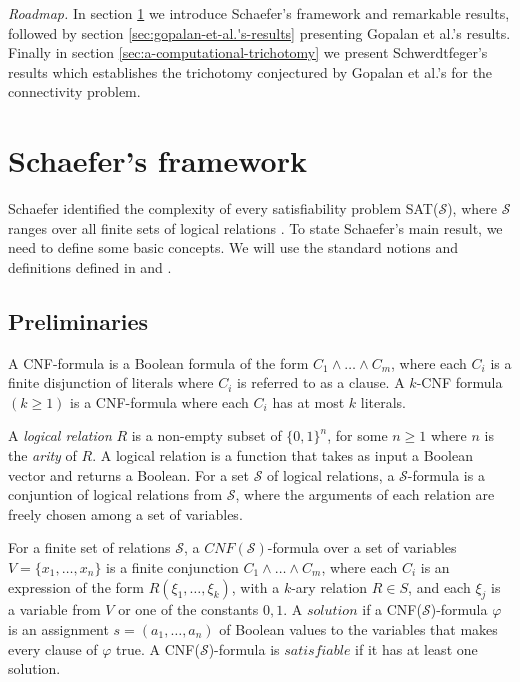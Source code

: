 \textit{Roadmap.} In section \ref{sec:schaefer's framework} we introduce Schaefer's framework and remarkable results, followed by section
\ref{sec:gopalan-et-al.'s-results} presenting Gopalan et al.'s results. Finally in section \ref{sec:a-computational-trichotomy} we present
Schwerdtfeger's results which establishes the trichotomy conjectured by Gopalan et al.'s for the connectivity problem.


\section{Schaefer's framework}\label{sec:schaefer's framework}
Schaefer identified the complexity of every satisfiability problem SAT($\mathcal{S}$), where $\mathcal{S}$ ranges over all finite sets of
logical relations \cite{schwerdtfeger_computational_2015}. To state Schaefer’s main result, we need to define some basic concepts.
We will use the standard notions and definitions defined in \cite{schaefer_complexity_1978} and \cite{DBLP:journals/siamcomp/GopalanKMP09}.

\subsection{Preliminaries}

A CNF-formula is a Boolean formula of the form $C_{1} \land \dots \land C_{m}$, where each $C_i$ is a finite disjunction of literals where $C_i$
is referred to as a clause. A $k$-CNF formula $(k \geq 1)$ is a CNF-formula where each $C_i$ has at most $k$ literals.


A \textit{logical relation} $R$ is a non-empty subset of $\{0,1\}^n$, for some $n \geq 1$ where $n$ is the \textit{arity} of $R$.
A logical relation is a function that takes as input a Boolean vector and returns a Boolean. For a set $\mathcal{S}$ of logical relations, a
$\mathcal{S}$-formula is a conjuntion of logical relations from $\mathcal{S}$, where the arguments of each relation are freely chosen among
a set of variables.

For a finite set of relations $\mathcal{S}$, a $CNF(\mathcal{S})$-formula over a set of variables $V = \{x_1, \dots, x_n\}$ is a finite
conjunction $C_{1} \land \dots \land C_{m}$, where each $C_i$ is an expression of the form $R(\xi_1,\dots , \xi_k)$, with a $k$-ary
relation $R \in S$, and each $\xi_j$ is a variable from $V$ or one of the constants $0, 1$. A $\textit{solution}$ if a
CNF($\mathcal{S}$)-formula $\varphi$ is an assignment $s = (a_{1}, \dots, a_{n})$ of Boolean values to the variables that makes every
clause of $\varphi$ true. A CNF($\mathcal{S}$)-formula is $\textit{satisfiable}$ if it has at least one solution.

